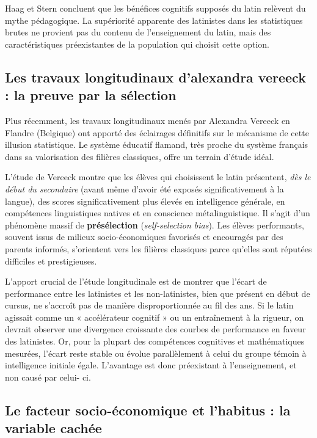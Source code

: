 Haag et Stern concluent que les bénéfices cognitifs supposés du latin relèvent du mythe pédagogique.
La supériorité apparente des latinistes dans les statistiques brutes ne provient pas du contenu de
l'enseignement du latin, mais des caractéristiques préexistantes de la population qui choisit cette
option.



\subsection{Les travaux longitudinaux d'alexandra vereeck : la preuve par la sélection}

Plus récemment, les travaux longitudinaux menés par Alexandra Vereeck en Flandre (Belgique) ont
apporté des éclairages définitifs sur le mécanisme de cette illusion statistique.\cite{II-1-2-ref9}
Le système éducatif flamand, très proche du système français dans sa valorisation des filières
classiques, offre un terrain d'étude idéal.

L'étude de Vereeck montre que les élèves qui choisissent le latin présentent, \textit{dès le début
du secondaire} (avant même d'avoir été exposés significativement à la langue), des scores
significativement plus élevés en intelligence générale, en compétences linguistiques natives et en
conscience métalinguistique.\cite{II-1-2-ref9} Il s'agit d'un phénomène massif de
\textbf{présélection} (\textit{self-selection bias}). Les élèves performants, souvent issus de
milieux socio-économiques favorisés et encouragés par des parents informés, s'orientent vers les
filières classiques parce qu'elles sont réputées difficiles et prestigieuses.

L'apport crucial de l'étude longitudinale est de montrer que l'écart de performance entre les
latinistes et les non-latinistes, bien que présent en début de cursus, ne s'accroît pas de manière
disproportionnée au fil des ans. Si le latin agissait comme un « accélérateur cognitif » ou un
entraînement à la rigueur, on devrait observer une divergence croissante des courbes de performance
en faveur des latinistes. Or, pour la plupart des compétences cognitives et mathématiques mesurées,
l'écart reste stable ou évolue parallèlement à celui du groupe témoin à intelligence initiale
égale.\cite{II-1-2-ref9} L'avantage est donc préexistant à l'enseignement, et non causé par celui-
ci.



\subsection{Le facteur socio-économique et l'habitus : la variable cachée}

